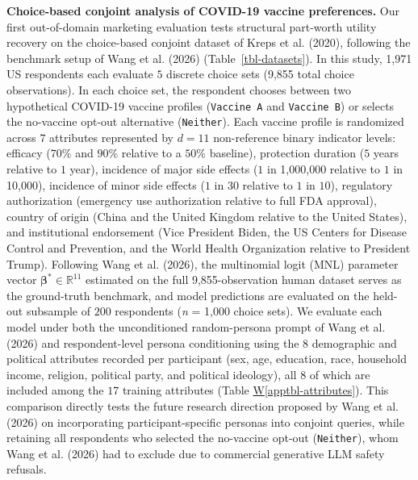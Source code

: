\documentclass[
  letterpaper,
  DIV=11,
  numbers=noendperiod]{scrartcl}
\newcommand*\quartoapptblref[1]{Table \hyperref[#1]{W\ref{#1}}}
\begin{document}
\textbf{Choice-based conjoint analysis of COVID-19 vaccine preferences.}
Our first out-of-domain marketing evaluation tests structural part-worth
utility recovery on the choice-based conjoint dataset of Kreps et al.
(2020), following the benchmark setup of Wang et al. (2026)
(Table~\ref{tbl-datasets}). In this study, 1,971 US respondents each
evaluate \(5\) discrete choice sets (9,855 total choice observations).
In each choice set, the respondent chooses between two hypothetical
COVID-19 vaccine profiles (\texttt{Vaccine\ A} and \texttt{Vaccine\ B})
or selects the no-vaccine opt-out alternative (\texttt{Neither}). Each
vaccine profile is randomized across \(7\) attributes represented by
\(d = 11\) non-reference binary indicator levels: efficacy (\(70\%\) and
\(90\%\) relative to a \(50\%\) baseline), protection duration (\(5\)
years relative to \(1\) year), incidence of major side effects (\(1\) in
1,000,000 relative to \(1\) in 10,000), incidence of minor side effects
(\(1\) in \(30\) relative to \(1\) in \(10\)), regulatory authorization
(emergency use authorization relative to full FDA approval), country of
origin (China and the United Kingdom relative to the United States), and
institutional endorsement (Vice President Biden, the US Centers for
Disease Control and Prevention, and the World Health Organization
relative to President Trump). Following Wang et al. (2026), the
multinomial logit (MNL) parameter vector
\(\boldsymbol{\beta}^* \in \mathbb{R}^{11}\) estimated on the full
9,855-observation human dataset serves as the ground-truth benchmark,
and model predictions are evaluated on the held-out subsample of \(200\)
respondents (\emph{n} = 1,000 choice sets). We evaluate each model under
both the unconditioned random-persona prompt of Wang et al. (2026) and
respondent-level persona conditioning using the \(8\) demographic and
political attributes recorded per participant (sex, age, education,
race, household income, religion, political party, and political
ideology), all \(8\) of which are included among the \(17\) training
attributes (\quartoapptblref{apptbl-attributes}). This comparison
directly tests the future research direction proposed by Wang et al.
(2026) on incorporating participant-specific personas into conjoint
queries, while retaining all respondents who selected the no-vaccine
opt-out (\texttt{Neither}), whom Wang et al. (2026) had to exclude due
to commercial generative LLM safety refusals.
\end{document}
